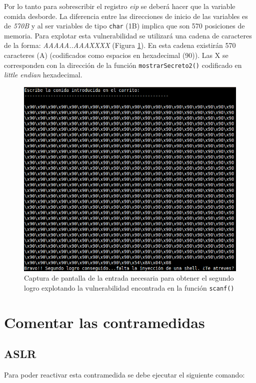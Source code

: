 \documentclass[10pt,a4paper]{article}
\begin{document}
Por lo tanto para sobrescribir el registro \emph{eip} se deberá hacer que la variable comida desborde. La diferencia entre las direcciones de inicio de las variables es de \emph{570B} y al ser variables de tipo \texttt{char} (1B) implica que son 570 posiciones de memoria. Para explotar esta vulnerabilidad se utilizará una cadena de caracteres de la forma: \emph{AAAAA..AAAXXXX} (Figura \ref{fig:inputSegundoLogroScanf}). En esta cadena existirán 570 caracteres (A) (codificados como espacios en hexadecimal (90)). Las X se corresponden con la dirección de la función \texttt{mostrarSecreto2()} codificado en \emph{little endian} hexadecimal.\\

\begin{figure}[h!]
\centering
\includegraphics[scale=0.9]{images/segundo_logro_scanf.png}
\caption{Captura de pantalla de la entrada necesaria para obtener el segundo logro explotando la vulnerabilidad encontrada en la función \texttt{scanf()}}
\label{fig:inputSegundoLogroScanf}
\end{figure}


\section{Comentar las contramedidas}

\subsection{ASLR} 
Para poder reactivar esta contramedida se debe ejecutar el siguiente comando:\\
\end{document}
